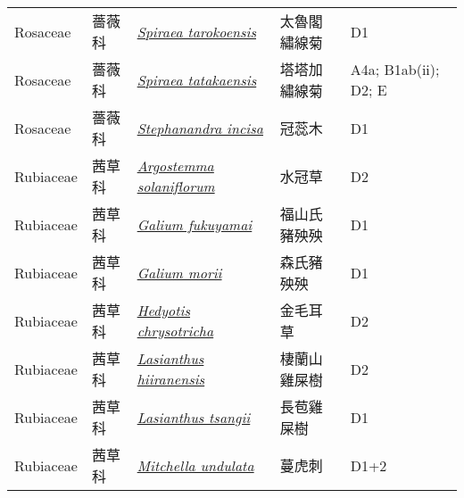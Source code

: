 {\begin{longtable}{p{2.5cm}p{2cm}p{5cm}p{2.5cm}p{3cm}}
    Rosaceae & 薔薇科 & \href{http://www.theplantlist.org/tpl1.1/search?q=Spiraea+tarokoensis}{\textit{Spiraea tarokoensis} } & 太魯閣繡線菊 & D1 \index{Spiraea@\textit{Spiraea}!tarokoensis@\textit{tarokoensis}}  \index{太魯閣繡線菊} \\
    Rosaceae & 薔薇科 & \href{http://www.theplantlist.org/tpl1.1/search?q=Spiraea+tatakaensis}{\textit{Spiraea tatakaensis} } & 塔塔加繡線菊 & A4a; B1ab(ii); D2; E \index{Spiraea@\textit{Spiraea}!tatakaensis@\textit{tatakaensis}}  \index{塔塔加繡線菊} \\
    Rosaceae & 薔薇科 & \href{http://www.theplantlist.org/tpl1.1/search?q=Stephanandra+incisa}{\textit{Stephanandra incisa} } & 冠蕊木 & D1 \index{Stephanandra@\textit{Stephanandra}!incisa@\textit{incisa}}  \index{冠蕊木} \\
    Rubiaceae & 茜草科 & \href{http://www.theplantlist.org/tpl1.1/search?q=Argostemma+solaniflorum}{\textit{Argostemma solaniflorum} } & 水冠草 & D2 \index{Argostemma@\textit{Argostemma}!solaniflorum@\textit{solaniflorum}}  \index{水冠草} \\
    Rubiaceae & 茜草科 & \href{http://www.theplantlist.org/tpl1.1/search?q=Galium+fukuyamai}{\textit{Galium fukuyamai} } & 福山氏豬殃殃 & D1 \index{Galium@\textit{Galium}!fukuyamai@\textit{fukuyamai}}  \index{福山氏豬殃殃} \\
    Rubiaceae & 茜草科 & \href{http://www.theplantlist.org/tpl1.1/search?q=Galium+morii}{\textit{Galium morii} } & 森氏豬殃殃 & D1 \index{Galium@\textit{Galium}!morii@\textit{morii}}  \index{森氏豬殃殃} \\
    Rubiaceae & 茜草科 & \href{http://www.theplantlist.org/tpl1.1/search?q=Hedyotis+chrysotricha}{\textit{Hedyotis chrysotricha} } & 金毛耳草 & D2 \index{Hedyotis@\textit{Hedyotis}!chrysotricha@\textit{chrysotricha}}  \index{金毛耳草} \\
    Rubiaceae & 茜草科 & \href{http://www.theplantlist.org/tpl1.1/search?q=Lasianthus+hiiranensis}{\textit{Lasianthus hiiranensis} } & 棲蘭山雞屎樹 & D2 \index{Lasianthus@\textit{Lasianthus}!hiiranensis@\textit{hiiranensis}}  \index{棲蘭山雞屎樹} \\
    Rubiaceae & 茜草科 & \href{http://www.theplantlist.org/tpl1.1/search?q=Lasianthus+tsangii}{\textit{Lasianthus tsangii} } & 長苞雞屎樹 & D1 \index{Lasianthus@\textit{Lasianthus}!tsangii@\textit{tsangii}}  \index{長苞雞屎樹} \\
    Rubiaceae & 茜草科 & \href{http://www.theplantlist.org/tpl1.1/search?q=Mitchella+undulata}{\textit{Mitchella undulata} } & 蔓虎刺 & D1+2 \index{Mitchella@\textit{Mitchella}!undulata@\textit{undulata}}  \index{蔓虎刺} \\

\end{longtable}}
